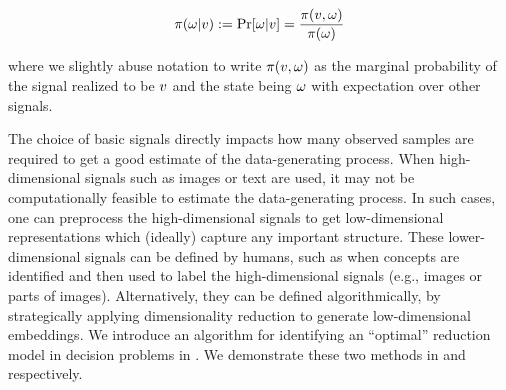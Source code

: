 \begin{itemize}[wide]
     \mvspace{-1mm}
    \[\pi(\omega| v) := \Pr[\omega|v]=\frac{\pi(v, \omega)}{\pi(\omega)}\]
 \mvspace{-4mm}

    \noindent where we slightly abuse notation to write $\pi(v, \omega)$ as the marginal
     probability of the signal realized to be $v$ and the state being $\omega$ with expectation over other signals.
\end{itemize}

The choice of basic signals directly impacts how many observed samples are required to get a good estimate of the data-generating process.
When high-dimensional signals such as images or text are used, it may not be computationally feasible to estimate the data-generating process.
In such cases, one can preprocess the high-dimensional signals to get low-dimensional representations which (ideally) capture any important structure. 
These lower-dimensional signals can be defined by humans, such as when concepts are identified and then used to label the high-dimensional signals (e.g., images or parts of images). 
Alternatively, they can be defined algorithmically, by strategically applying dimensionality reduction to generate low-dimensional embeddings.
We introduce an algorithm for identifying an ``optimal'' reduction model in decision problems in .
We demonstrate these two methods in  and  respectively.




